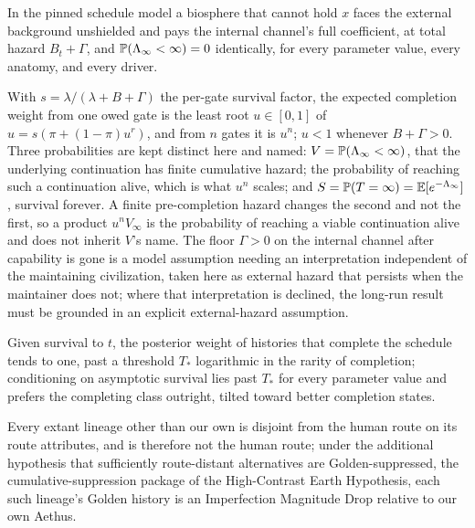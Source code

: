 \begin{proposition}\label{imp:gating}
In the pinned schedule model a biosphere that cannot hold $x$ faces the
external background unshielded and pays the internal channel's full
coefficient, at total hazard $B_t+\Gamma$, and $\mathbb{P}(\Lambda_\infty<\infty)=0$
identically, for every parameter value, every anatomy, and every
driver.
\end{proposition}

\begin{proposition}\label{imp:fixedpoint}
With $s=\lambda/(\lambda+B+\Gamma)$ the per-gate survival factor, the
expected completion weight from one owed gate is the least root
$u\in[0,1]$ of $u=s(\pi+(1-\pi)u^{r})$, and from $n$ gates it is $u^{n}$; $u<1$ whenever $B+\Gamma>0$. Three probabilities are kept distinct here and named: $V = \mathbb{P}(\Lambda_\infty < \infty)$, that the underlying continuation has finite cumulative hazard; the probability of reaching such a continuation alive, which is what $u^{n}$ scales; and $S = \mathbb{P}(T = \infty) = \mathbb{E}[e^{-\Lambda_\infty}]$, survival forever. A finite pre-completion hazard changes the second and not the first, so a product $u^{n}V_\infty$ is the probability of reaching a viable continuation alive and does not inherit $V$'s name. The floor $\Gamma > 0$ on the internal channel after capability is gone is a model assumption needing an interpretation independent of the maintaining civilization, taken here as external hazard that persists when the maintainer does not; where that interpretation is declined, the long-run result must be grounded in an explicit external-hazard assumption.
\end{proposition}

\begin{proposition}\label{imp:threshold}
Given survival to $t$, the posterior weight of histories that complete
the schedule tends to one, past a threshold $T_\ast$ logarithmic in the
rarity of completion; conditioning on asymptotic survival lies past
$T_\ast$ for every parameter value and prefers the completing class
outright, tilted toward better completion states.
\end{proposition}

\begin{lemma}
\label{imp:condimd}
Every extant lineage other than our own is disjoint from the human
route on its route attributes, and is therefore not the human route;
under the additional hypothesis that sufficiently route-distant
alternatives are Golden-suppressed, the cumulative-suppression package
of the High-Contrast Earth Hypothesis, each such lineage's Golden
history is an Imperfection Magnitude Drop relative to our own Aethus.
\end{lemma}


